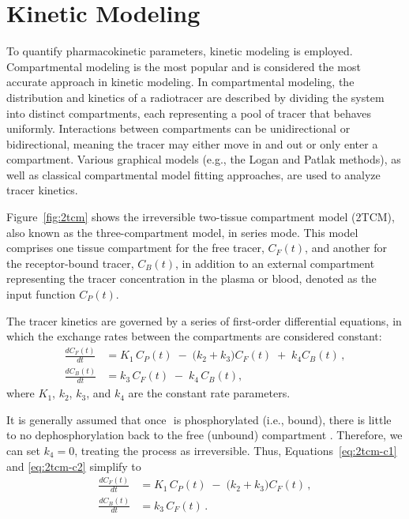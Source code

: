 \section{Kinetic Modeling}
To quantify pharmacokinetic parameters, kinetic modeling is employed.
Compartmental modeling is the most popular and is considered the most accurate approach in kinetic modeling.
In compartmental modeling, the distribution and kinetics of a radiotracer are described by dividing the system into distinct compartments, each representing a pool of tracer that behaves uniformly.
Interactions between compartments can be unidirectional or bidirectional, meaning the tracer may either move in and out or only enter a compartment.
Various graphical models (e.g., the Logan \cite{logan1990graphical} and Patlak \cite{patlak1983graphical} methods), as well as classical compartmental model fitting approaches, are used to analyze tracer kinetics.

Figure~\ref{fig:2tcm} shows the irreversible two-tissue compartment model (2TCM), also known as the three-compartment model, in series mode.
This model comprises one tissue compartment for the free tracer, \(C_F(t)\), and another for the receptor-bound tracer, \(C_B(t)\), in addition to an external compartment representing the tracer concentration in the plasma or blood, denoted as the input function \(C_P(t)\).

The tracer kinetics are governed by a series of first-order differential equations, in which the exchange rates between the compartments are considered constant:
\begin{align}
	\frac{dC_F(t)}{dt} & = K_1 \, C_P(t) \;-\; \bigl(k_2 + k_3\bigr) C_F(t) \;+\; k_4 C_B(t) \,, \label{eq:2tcm-c1} \\[6pt]
	\frac{dC_B(t)}{dt} & = k_3 \, C_F(t) \;-\; k_4 \, C_B(t), \label{eq:2tcm-c2}
\end{align}
where \(K_1\), \(k_2\), \(k_3\), and \(k_4\) are the constant rate parameters.

It is generally assumed that once \fdg$ $ is phosphorylated (i.e., bound), there is little to no dephosphorylation back to the free (unbound) compartment \cite{schmidt1992errors}.
Therefore, we can set \(k_4 = 0\), treating the process as irreversible.
Thus, Equations~\eqref{eq:2tcm-c1} and \eqref{eq:2tcm-c2} simplify to
\begin{align}
	\frac{dC_F(t)}{dt} & = K_1 \, C_P(t) \;-\; \bigl(k_2 + k_3\bigr) C_F(t) \,, \\[6pt]
	\frac{dC_B(t)}{dt} & = k_3 \, C_F(t) \,.
\end{align}


